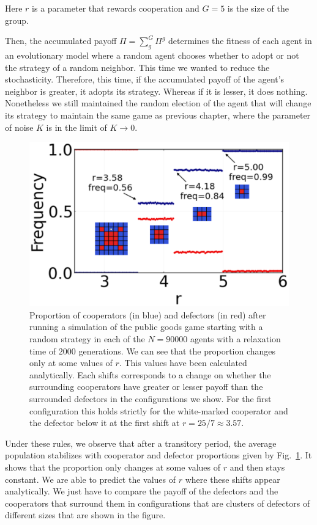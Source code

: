 Here $r$ is a parameter that rewards cooperation and $G = 5$ is the size of the group.

Then, the accumulated payoff $\Pi=\sum_g^G \Pi^g$ determines the fitness of each agent in an evolutionary model where a random agent chooses whether to adopt or not the strategy of a random neighbor. This time we wanted to reduce the stochasticity. Therefore, this time, if the accumulated payoff of the agent's neighbor is greater, it adopts its strategy. Whereas if it is lesser, it does nothing. Nonetheless we still maintained the random election of the agent that will change its strategy to maintain the same game as previous chapter, where the parameter of noise $K$ is in the limit of $K \to 0$.


\begin{figure}
	\centering
	\includegraphics[width=1\linewidth]{Images/P3/PGG_Proportion.eps}
	\caption{Proportion of cooperators (in blue) and defectors (in red) after running a simulation of the public goods game starting with a random strategy in each of the $N=90000$ agents with a relaxation time of $2000$ generations. We can see that the proportion changes only at some values of $r$. This values have been calculated analytically. Each shifts corresponds to a change on whether the surrounding cooperators have greater or lesser payoff than the surrounded defectors in the configurations we show. For the first configuration this holds strictly for the white-marked cooperator and the defector below it at the first shift at $r=25/7\approx3.57$.}
	\label{fig:PGG_Proportion}
\end{figure}


Under these rules, we observe that after a transitory period, the average population stabilizes with  cooperator and defector proportions given by Fig.~\ref{fig:PGG_Proportion}. It shows that the proportion only changes at some values of $r$ and then stays constant. We are able to predict the values of $r$ where these shifts appear analytically. We just have to compare the payoff of the defectors and the cooperators that surround them in configurations that are clusters of defectors of different sizes that are shown in the figure.

